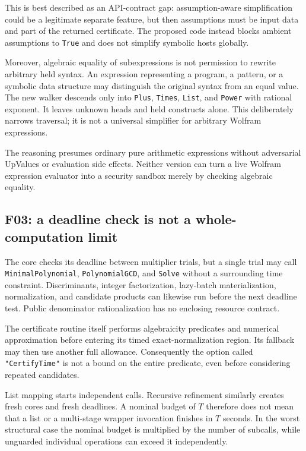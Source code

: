 \documentclass[11pt,letterpaper]{article}
\newcommand{\code}[1]{\texttt{#1}}
\theoremstyle{definition}
\begin{document}
This is best described as an API-contract gap: assumption-aware simplification could be a legitimate separate feature, but then assumptions must be input data and part of the returned certificate. The proposed code instead blocks ambient assumptions to \code{True} and does not simplify symbolic hosts globally.

Moreover, algebraic equality of subexpressions is not permission to rewrite arbitrary held syntax. An expression representing a program, a pattern, or a symbolic data structure may distinguish the original syntax from an equal value. The new walker descends only into \code{Plus}, \code{Times}, \code{List}, and \code{Power} with rational exponent. It leaves unknown heads and held constructs alone. This deliberately narrows traversal; it is not a universal simplifier for arbitrary Wolfram expressions.

The reasoning presumes ordinary pure arithmetic expressions without adversarial UpValues or evaluation side effects. Neither version can turn a live Wolfram expression evaluator into a security sandbox merely by checking algebraic equality.

\subsection{F03: a deadline check is not a whole-computation limit}

The core checks its deadline between multiplier trials, but a single trial may call \code{MinimalPolynomial}, \code{PolynomialGCD}, and \code{Solve} without a surrounding time constraint. Discriminants, integer factorization, lazy-batch materialization, normalization, and candidate products can likewise run before the next deadline test. Public denominator rationalization has no enclosing resource contract.\cite{fixed}

The certificate routine itself performs algebraicity predicates and numerical approximation before entering its timed exact-normalization region. Its fallback may then use another full allowance. Consequently the option called \code{"CertifyTime"} is not a bound on the entire predicate, even before considering repeated candidates.

List mapping starts independent calls. Recursive refinement similarly creates fresh cores and fresh deadlines. A nominal budget of $T$ therefore does not mean that a list or a multi-stage wrapper invocation finishes in $T$ seconds. In the worst structural case the nominal budget is multiplied by the number of subcalls, while unguarded individual operations can exceed it independently.
\end{document}

